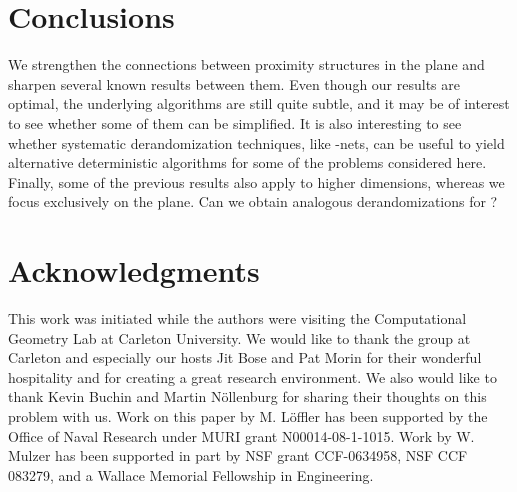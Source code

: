 \documentclass[11pt]{paper}
\begin{document}
\section{Conclusions}

We strengthen the connections between proximity structures
in the plane and sharpen several known results between them.
Even though our results are optimal, the underlying algorithms are 
still quite subtle, and it may be of interest to see whether some of
them can be simplified. It is also interesting to see whether systematic
derandomization techniques, like -nets, can be useful to yield 
alternative deterministic algorithms for some of the problems considered
here. Finally, some of the previous results also apply to higher dimensions,
whereas we focus exclusively on the plane. Can we obtain analogous 
derandomizations for ?

\section*{Acknowledgments}

This work was initiated while the authors were visiting the Computational
Geometry Lab at Carleton University. We would like to thank the group
at Carleton and especially our hosts Jit Bose and Pat Morin for their
wonderful hospitality and for creating a great research environment.
We also would like to thank Kevin Buchin and Martin N\"ollenburg for
sharing their thoughts on this problem with us.
Work on this paper by M. L\"offler has been supported by the Office of
Naval Research under MURI grant N00014-08-1-1015.
Work by W. Mulzer has been supported in part by NSF grant CCF-0634958,
NSF CCF 083279, and a Wallace Memorial Fellowship in Engineering.

\small
\end{document}
